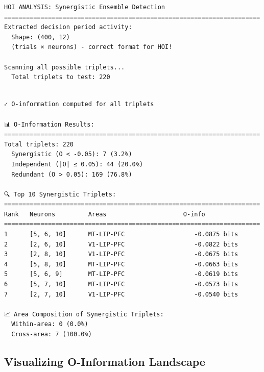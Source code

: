 \documentclass[
  11pt,
  letterpaper,
  oneside,
  openany]{book}
\begin{document}
\begin{verbatim}
HOI ANALYSIS: Synergistic Ensemble Detection
======================================================================
Extracted decision period activity:
  Shape: (400, 12)
  (trials × neurons) - correct format for HOI!

Scanning all possible triplets...
  Total triplets to test: 220
\end{verbatim}

\begin{verbatim}

✓ O-information computed for all triplets

📊 O-Information Results:
======================================================================
Total triplets: 220
  Synergistic (O < -0.05): 7 (3.2%)
  Independent (|O| ≤ 0.05): 44 (20.0%)
  Redundant (O > 0.05): 169 (76.8%)

🔍 Top 10 Synergistic Triplets:
======================================================================
Rank   Neurons         Areas                     O-info      
======================================================================
1      [5, 6, 10]      MT-LIP-PFC                   -0.0875 bits
2      [2, 6, 10]      V1-LIP-PFC                   -0.0822 bits
3      [2, 8, 10]      V1-LIP-PFC                   -0.0675 bits
4      [5, 8, 10]      MT-LIP-PFC                   -0.0663 bits
5      [5, 6, 9]       MT-LIP-PFC                   -0.0619 bits
6      [5, 7, 10]      MT-LIP-PFC                   -0.0573 bits
7      [2, 7, 10]      V1-LIP-PFC                   -0.0540 bits

📈 Area Composition of Synergistic Triplets:
  Within-area: 0 (0.0%)
  Cross-area: 7 (100.0%)
\end{verbatim}

\subsection{Visualizing O-Information
Landscape}\label{visualizing-o-information-landscape}
\end{document}
